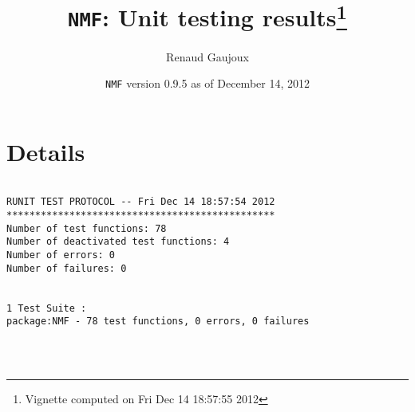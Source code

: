 \documentclass[10pt]{article}
\author{Renaud Gaujoux}
\title{\texttt{NMF}: Unit testing results\footnote{Vignette computed  on Fri Dec 14 18:57:55 2012}}
\date{\texttt{NMF} version 0.9.5 as of December 14, 2012}
\begin{document}
\maketitle

\section{Details}
\begin{verbatim}

RUNIT TEST PROTOCOL -- Fri Dec 14 18:57:54 2012 
*********************************************** 
Number of test functions: 78 
Number of deactivated test functions: 4 
Number of errors: 0 
Number of failures: 0 

 
1 Test Suite : 
package:NMF - 78 test functions, 0 errors, 0 failures




\end{verbatim}
\end{document}
